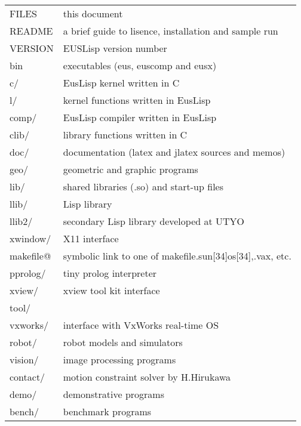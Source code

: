 \setcounter{enumi}{3}
{\newpage
\clearpage
\samepage 
\begin{table}\begin{center}
{\footnotesize
\begin{tabular}{|l | l|}\hline 
FILES &  this document \\ 
README &  a brief guide to lisence, installation and sample run\\ 
VERSION &  EUSLisp version number\\ 
bin &  executables (eus, euscomp and eusx) \\ 
c/ &  EusLisp kernel written in C\\ 
l/ &  kernel functions written in EusLisp\\ 
comp/ &  EusLisp compiler written in EusLisp\\ 
clib/ &  library functions written in C\\ 
doc/ &  documentation (latex and jlatex sources and memos)\\ 
geo/ &  geometric and graphic programs\\ 
lib/ & shared libraries (.so) and start-up files\\ 
llib/ &  Lisp library \\ 
llib2/ &  secondary Lisp library developed at UTYO\\ 
xwindow/ &  X11 interface\\ 
makefile@ &  symbolic link to one of makefile.sun[34]os[34],.vax, etc.\\ 
pprolog/ &  tiny prolog interpreter\\ 
xview/ &  xview tool kit interface\\ 
tool/ & \\ 
vxworks/ & interface with VxWorks real-time OS\\ 
robot/ & robot models and simulators\\ 
vision/ &  image processing programs\\ 
contact/ & motion constraint solver by H.Hirukawa
\cite{Hirukawa:1991a,Hirukawa:1991b,Hirukawa:1991c}\\ 
demo/ &  demonstrative programs\\ 
bench/ &  benchmark programs\\  \hline
\end{tabular}
}
\end{center}

\end{table}
}

